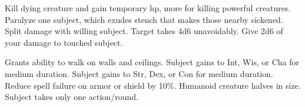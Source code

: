 \begin{swspelllist}
   Kill dying creature and gain temporary hp, more for killing powerful creatures.
   Paralyze one subject, which exudes stench that makes those nearby sickened.
   Split damage with willing subject.
   Target takes 4d6 unavoidably.
   Give 2d6 of your damage to touched subject.

   Grants ability to walk on walls and ceilings.
   Subject gains  to Int, Wis, or Cha for medium duration.
   Subject gains  to Str, Dex, or Con for medium duration.
   Reduce spell failure on armor or shield by 10\%.
   Humanoid creature halves in size.
   Subject takes only one action/round.
\end{swspelllist}

